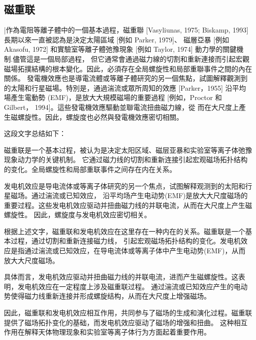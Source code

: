 \documentclass[12pt, a4paper, oneside]{ctexart}
\begin{document}
\begin{spacing}{2.0}
\section{磁重联}
|作為電阻等離子體中的一個基本過程，磁重聯 [Vasyliunas, 1975; Biskamp, 1993] 長期以來一直被認為是決定太陽區域 [例如 Parker, 1979]、
磁層亞暴 [例如 Akasofu, 1972] 和實驗室等離子體弛豫現象 [例如 Taylor, 1974] 動力學的關鍵機制.儘管這是一個局部過程，
但它通常會通過磁力線的切割和重新連接而引起宏觀磁場拓撲結構的根本變化。因此，必須存在全局螺旋性和局部重聯事件之間的內在關係。
發電機效應也是導電流體或等離子體研究的另一個焦點，試圖解釋觀測到的太陽和行星磁場。特別是，通過湍流或眾所周知的效應 [Parker，1955] 
沿平均場產生電動勢 (EMF)，是放大大規模磁場的重要過程 [例如，Proctor 和 Gilbert， 1994]。這些發電機效應驅動並聯電流扭曲磁力線，從
而在大尺度上產生磁螺旋性。因此，螺旋度也必然與發電機效應密切相關。

这段文字总结如下：

磁重联是一个基本过程，被认为是决定太阳区域、磁层亚暴和实验室等离子体弛豫现象动力学的关键机制。
它通过磁力线的切割和重新连接引起宏观磁场拓扑结构的变化。全局螺旋性和局部重联事件之间存在内在关系。

发电机效应是导电流体或等离子体研究的另一个焦点，试图解释观测到的太阳和行星磁场。通过湍流或已知效应，
沿平均场产生电动势(EMF)是放大大尺度磁场的重要过程。这些发电机效应驱动并扭曲磁力线的并联电流，从而在大尺度上产生磁螺旋性。
因此，螺旋度与发电机效应密切相关。

根据上述文字，磁重联和发电机效应在这里存在一种内在的关系。磁重联是一个基本过程，通过切割和重新连接磁力线，
引起宏观磁场拓扑结构的变化。发电机效应是指通过湍流或已知效应，在导电流体或等离子体中产生电动势(EMF)，从而放大大尺度磁场。

具体而言，发电机效应驱动并扭曲磁力线的并联电流，进而产生磁螺旋性。这表明，发电机效应在一定程度上涉及磁重联过程。
通过湍流或已知效应产生的电动势使得磁力线重新连接并形成螺旋结构，从而在大尺度上增强磁场。

因此，磁重联和发电机效应相互作用，共同参与了磁场的生成和演化过程。磁重联提供了磁场拓扑变化的基础，而发电机效应驱动了磁场的增强和扭曲。
这种相互作用在解释天体物理现象和实验室等离子体行为方面起着重要作用。









\end{spacing}{}
\end{document}
